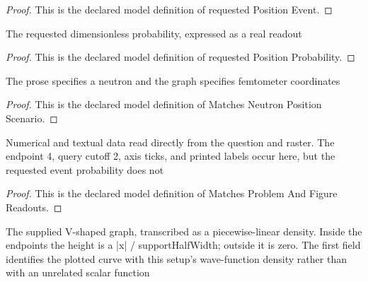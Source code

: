 \begin{proof}
  This is the declared model definition of requested Position Event.
\end{proof}
\begin{definition}
  \label{def:physics:phyx-mini-0503:phyxminiproblems-problemphyxmini0503-requestedpositionprobability}
  The requested dimensionless probability, expressed as a real readout
\end{definition}
\begin{proof}
  This is the declared model definition of requested Position Probability.
\end{proof}
\begin{definition}
  \label{def:physics:phyx-mini-0503:phyxminiproblems-problemphyxmini0503-matchesneutronpositionscenario}
  The prose specifies a neutron and the graph specifies femtometer coordinates
\end{definition}
\begin{proof}
  This is the declared model definition of Matches Neutron Position Scenario.
\end{proof}
\begin{definition}
  \label{def:physics:phyx-mini-0503:phyxminiproblems-problemphyxmini0503-matchesproblemandfigurereadouts}
  Numerical and textual data read directly from the question and raster. The endpoint 4, query cutoff 2, axis ticks, and printed labels occur here, but the requested event probability does not
\end{definition}
\begin{proof}
  This is the declared model definition of Matches Problem And Figure Readouts.
\end{proof}
\begin{definition}
  \label{def:physics:phyx-mini-0503:phyxminiproblems-problemphyxmini0503-matchessuppliedprobabilitydensityfigure}
  The supplied V-shaped graph, transcribed as a piecewise-linear density. Inside the endpoints the height is a |x| / supportHalfWidth; outside it is zero. The first field identifies the plotted curve with this setup's wave-function density rather than with an unrelated scalar function
\end{definition}

